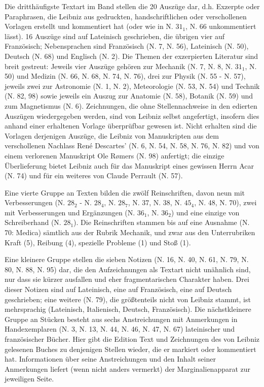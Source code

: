 Die dritthäufigste Textart im Band stellen die 20 Auszüge dar, d.h. Exzerpte oder Paraphrasen, die Leibniz aus gedruckten, handschriftlichen oder verschollenen Vorlagen erstellt und kommentiert hat (oder wie in N. $31_1$, N. 66 unkommentiert lässt). 16 Auszüge sind auf Lateinisch geschrieben, die übrigen vier auf Französisch; Nebensprachen sind Französisch (N. 7, N. 56), Lateinisch (N. 50), Deutsch (N. 68) und Englisch (N. 2). Die Themen der exzerpierten Literatur sind breit gestreut: Jeweils vier Auszüge gehören zur Mechanik (N. 7, N. 8, N. $31_1$, N. 50) und Medizin (N. 66, N. 68, N. 74, N. 76), drei zur Physik (N. 55 - N. 57), jeweils zwei zur Astronomie (N. 1, N. 2), Meteorologie (N. 53, N. 54) und Technik (N. 82, 98) sowie jeweils ein Auszug zur Anatomie (N. 58), Botanik (N. 59) und zum Magnetismus (N. 6). Zeichnungen, die ohne Stellennachweise in den edierten Auszügen wiedergegeben werden, sind von Leibniz selbst angefertigt, insofern dies anhand einer erhaltenen Vorlage überprüfbar gewesen ist. Nicht erhalten sind die Vorlagen derjenigen Auszüge, die Leibniz von Manuskripten aus dem verschollenen Nachlass René Descartes' (N. 6, N. 54, N. 58, N. 76, N. 82) und von einem verlorenen Manuskript Ole R{\o}mers (N. 98) anfertigt; die einzige Überlieferung bietet Leibniz auch für das Manuskript eines gewissen Herrn Acar (N. 74) und für ein weiteres von Claude Perrault (N. 57).\par
Eine vierte Gruppe an Texten bilden die zwölf Reinschriften, davon neun mit Verbesserungen (N. $28_2$ - N. $28_4$, N. $28_7$, N. 37, N. 38, N. $45_4$, N. 48, N. 70), zwei mit Verbesserungen und  Ergänzungen (N. $36_1$, N. $36_2$) und eine einzige von Schreiberhand (N. $28_1$). Die Reinschriften stammen bis auf eine Ausnahme (N. 70: Medica) sämtlich aus der Rubrik Mechanik, und zwar aus den Unterrubriken Kraft (5), Reibung (4), spezielle Probleme (1) und Stoß (1).\par
Eine kleinere Gruppe stellen die sieben Notizen (N. 16, N. 40, N. 61, N. 79, N. 80, N. 88, N. 95) dar, die den Aufzeichnungen als Textart nicht unähnlich sind, nur dass sie kürzer ausfallen und eher fragmentarischen Charakter haben. Drei dieser Notizen sind auf Lateinisch, eine auf Französisch, eine auf Deutsch geschrieben; eine weitere (N. 79), die größtenteils nicht von Leibniz stammt, ist mehrsprachig (Lateinisch, Italienisch, Deutsch, Französisch). Die nächstkleinere Gruppe an Stücken besteht aus sechs Anstreichungen mit Anmerkungen in Handexemplaren (N. 3, N. 13, N. 44, N. 46, N. 47, N. 67) lateinischer und französischer Bücher. Hier gibt die Edition Text und Zeichnungen des von Leibniz gelesenen Buches zu denjenigen Stellen wieder, die er markiert oder kommentiert hat. Informationen über seine Anstreichungen und den Inhalt seiner Anmerkungen liefert (wenn nicht anders vermerkt) der Marginalienapparat zur jeweiligen Seite.\par
